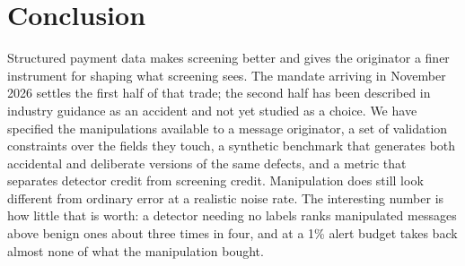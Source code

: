 \documentclass[conference]{IEEEtran}
\begin{document}
\section{Conclusion}

Structured payment data makes screening better and gives the originator a
finer instrument for shaping what screening sees. The mandate arriving in
November 2026 settles the first half of that trade; the second half has been
described in industry guidance as an accident and not yet studied as a
choice. We have specified the manipulations available to a message
originator, a set of validation constraints over the fields they touch, a
synthetic benchmark that generates both accidental and deliberate versions of
the same defects, and a metric that separates detector credit from screening
credit. Manipulation does still look different from ordinary error at a realistic
noise rate. The interesting number is how little that is worth: a detector
needing no labels ranks manipulated messages above benign ones about three
times in four, and at a 1\% alert budget takes back almost none of what the
manipulation bought.
\end{document}
